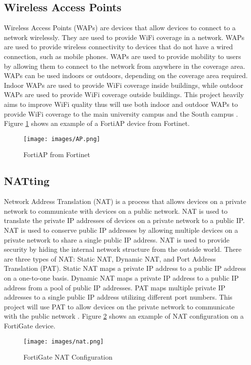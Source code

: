 \documentclass[12pt]{report}
\begin{document}
\subsection{Wireless Access Points}
Wireless Access Points (WAPs) are devices that allow devices to connect to a network wirelessly. They are used to provide WiFi coverage in a network. WAPs are used to provide wireless connectivity to devices that do not have a wired connection, such as mobile phones. WAPs are used to provide mobility to users by allowing them to connect to the network from anywhere in the coverage area. WAPs can be used indoors or outdoors, depending on the coverage area required. Indoor WAPs are used to provide WiFi coverage inside buildings, while outdoor WAPs are used to provide WiFi coverage outside buildings. This project heavily aims to improve WiFi quality thus will use both indoor and outdoor WAPs to provide WiFi coverage to the main university campus and the South campus \cite{FortiAP}.
Figure \ref{fig:FortiAP} shows an example of a FortiAP device from Fortinet. 
\begin{figure}[h]
    \centering
    \texttt{[image: images/AP.png]}
    \caption{FortiAP from Fortinet \cite{FAPIMG}}
    \label{fig:FortiAP}
\end{figure}

\subsection{NATting}
Network Address Translation (NAT) is a process that allows devices on a private network to communicate with devices on a public network. NAT is used to translate the private IP addresses of devices on a private network to a public IP. NAT is used to conserve public IP addresses by allowing multiple devices on a private network to share a single public IP address. NAT is used to provide security by hiding the internal network structure from the outside world. There are three types of NAT: Static NAT, Dynamic NAT, and Port Address Translation (PAT). Static NAT maps a private IP address to a public IP address on a one-to-one basis. Dynamic NAT maps a private IP address to a public IP address from a pool of public IP addresses. PAT maps multiple private IP addresses to a single public IP address utilizing different port numbers. This project will use PAT to allow devices on the private network to communicate with the public network \cite{NATTing}. Figure \ref{fig:NAT} shows an example of NAT configuration on a FortiGate device.
\begin{figure}[h]
    \centering
    \texttt{[image: images/nat.png]}
    \caption{FortiGate NAT Configuration \cite{NATIMG}}
    \label{fig:NAT}
\end{figure}
\end{document}
